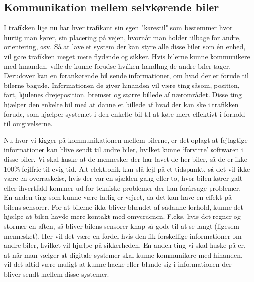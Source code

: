
\subsection{Kommunikation mellem selvkørende biler}

I trafikken lige nu har hver trafikant sin egen "kørestil" som bestemmer hvor hurtig man kører, sin placering på vejen, hvornår man holder tilbage for andre, orientering, osv.  Så at lave et system der kan styre alle disse biler som \'en enhed, vil gøre trafikken meget mere flydende og sikker. Hvis bilerne kunne kommunikere med hinanden, ville de kunne forudse hvilken handling de andre biler tager. Derudover kan en forankørende bil sende informationer, om hvad der er forude til bilerne bagude. Informationen de giver hinanden vil være ting såsom, position, fart, hjulenes drejeposition, bremser og større billede af nærområdet. Disse ting hjælper den enkelte bil med at danne et billede af hvad der kan ske i trafikken forude, som hjælper systemet i den enkelte bil til at køre mere effektivt i forhold til omgivelserne. 

Nu hvor vi kigger på kommunikationen mellem bilerne, er det oplagt at fejlagtige informationer kan blive sendt til andre biler, hvilket kunne `forvirre' softwaren i disse biler. Vi skal huske at de mennesker der har lavet de her biler, så de er ikke 100\% fejlfrie til evig tid. Alt elektronik kan slå fejl på et tidspunkt, så det vil ikke være en overraskelse, hvis der var en sjælden gang eller to, hvor bilen kører galt eller ihvertfald kommer ud for tekniske problemer der kan forårsage problemer. En anden ting som kunne være farlig er vejret, da det kan have en effekt på bilens sensorer. For at bilerne ikke bliver blændet af sådanne forhold, kunne det hjælpe at bilen havde mere kontakt med omverdenen. F.eks. hvis det regner og stormer en aften, så bliver bilens sensorer knap så gode til at se langt (ligesom mennesket). Her vil det være en fordel hvis den fik forskellige informationer om andre biler, hvilket vil hjælpe på sikkerheden. En anden ting vi skal huske på er, at når man vælger at digitale systemer skal kunne kommunikere med hinanden, vil det altid være muligt at kunne hacke eller blande sig i informationen der bliver sendt mellem disse systemer.
